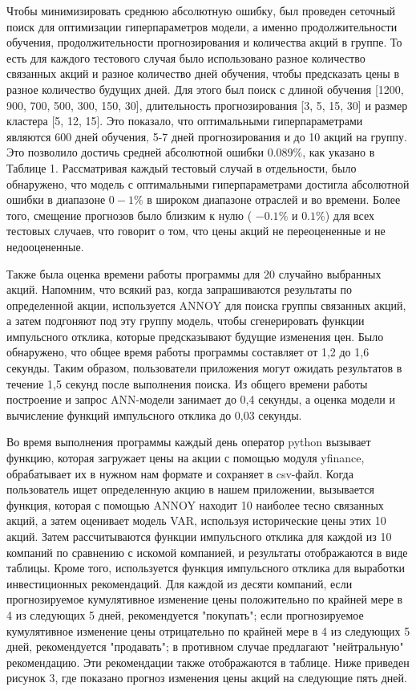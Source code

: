 \begin{multicols}{2}
Чтобы минимизировать среднюю абсолютную ошибку, был проведен сеточный
поиск для оптимизации гиперпараметров модели, а именно продолжительности
обучения, продолжительности прогнозирования и количества акций в группе.
То есть для каждого тестового случая было использовано разное количество
связанных акций и разное количество дней обучения, чтобы предсказать
цены в разное количество будущих дней. Для этого был поиск с длиной
обучения {[}1200, 900, 700, 500, 300, 150, 30{]}, длительность
прогнозирования {[}3, 5, 15, 30{]} и размер кластера {[}5, 12, 15{]}.
Это показало, что оптимальными гиперпараметрами являются 600 дней
обучения, 5-7 дней прогнозирования и до 10 акций на группу. Это
позволило достичь средней абсолютной ошибки 0.089\%, как указано в
Таблице 1. Рассматривая каждый тестовый случай в отдельности, было
обнаружено, что модель с оптимальными гиперпараметрами достигла
абсолютной ошибки в диапазоне \(0 - 1\text{\%}\) в широком диапазоне
отраслей и во времени. Более того, смещение прогнозов было близким к
нулю (\(\) \(- 0.1\text{\%}\) и \(0.1\text{\%}\)) для всех тестовых
случаев, что говорит о том, что цены акций не переоцененные и не
недооцененные.

Также была оценка времени работы программы для 20 случайно выбранных
акций. Напомним, что всякий раз, когда запрашиваются результаты по
определенной акции, используется ANNOY для поиска группы связанных
акций, а затем подгоняют под эту группу модель, чтобы сгенерировать
функции импульсного отклика, которые предсказывают будущие изменения
цен. Было обнаружено, что общее время работы программы составляет от 1,2
до 1,6 секунды. Таким образом, пользователи приложения могут ожидать
результатов в течение 1,5 секунд после выполнения поиска. Из общего
времени работы построение и запрос ANN-модели занимает до 0,4 секунды, а
оценка модели и вычисление функций импульсного отклика до 0,03 секунды.

Во время выполнения программы каждый день оператор python вызывает
функцию, которая загружает цены на акции с помощью модуля yfinance,
обрабатывает их в нужном нам формате и сохраняет в csv-файл. Когда
пользователь ищет определенную акцию в нашем приложении, вызывается
функция, которая с помощью ANNOY находит 10 наиболее тесно связанных
акций, а затем оценивает модель VAR, используя исторические цены этих 10
акций. Затем рассчитываются функции импульсного отклика для каждой из 10
компаний по сравнению с искомой компанией, и результаты отображаются в
виде таблицы. Кроме того, используется функция импульсного отклика для
выработки инвестиционных рекомендаций. Для каждой из десяти компаний,
если прогнозируемое кумулятивное изменение цены положительно по крайней
мере в 4 из следующих 5 дней, рекомендуется "покупать"; если
прогнозируемое кумулятивное изменение цены отрицательно по крайней мере
в 4 из следующих 5 дней, рекомендуется "продавать"; в противном случае
предлагают "нейтральную" рекомендацию. Эти рекомендации также
отображаются в таблице. Ниже приведен рисунок 3, где показано прогноз
изменения цены акций на следующие пять дней.
\end{multicols}

